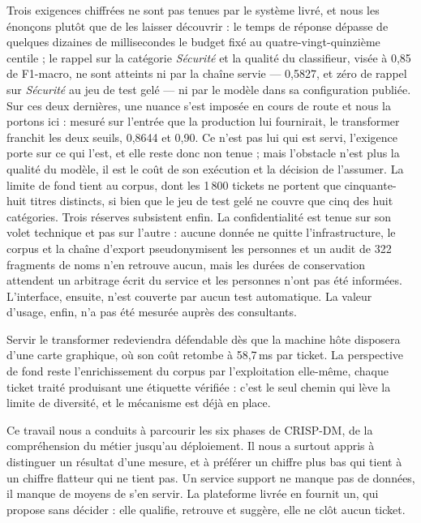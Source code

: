 Trois exigences chiffrées ne sont pas tenues par le système livré, et nous les énonçons plutôt que
de les laisser découvrir : le temps de réponse dépasse de quelques dizaines de millisecondes le
budget fixé au quatre-vingt-quinzième centile ; le rappel sur la catégorie \emph{Sécurité} et la qualité du classifieur,
visée à 0,85 de F1-macro, ne sont atteints ni par la chaîne servie — 0,5827, et zéro de rappel sur
\emph{Sécurité} au jeu de test gelé — ni par le modèle dans sa configuration publiée. Sur ces deux
dernières, une nuance s'est imposée en cours de route et nous la portons ici : mesuré sur l'entrée
que la production lui fournirait, le transformer franchit les deux seuils, 0,8644 et 0,90. Ce
n'est pas lui qui est servi, l'exigence porte sur ce qui l'est, et elle reste donc non tenue ; mais
l'obstacle n'est plus la qualité du modèle, il est le coût de son exécution et la décision de
l'assumer. La
limite de fond tient au corpus, dont les 1\,800 tickets ne portent que cinquante-huit titres
distincts, si bien que le jeu de test gelé ne couvre que cinq des huit catégories. Trois réserves
subsistent enfin. La confidentialité est tenue sur son volet technique et pas sur l'autre : aucune
donnée ne quitte l'infrastructure, le corpus et la chaîne d'export pseudonymisent les personnes et
un audit de 322 fragments de noms n'en retrouve aucun, mais les durées de conservation attendent un
arbitrage écrit du service et les personnes n'ont pas été informées. L'interface, ensuite, n'est
couverte par aucun test automatique. La valeur d'usage, enfin, n'a pas été mesurée auprès des
consultants.

Servir le transformer redeviendra défendable dès que la machine hôte disposera d'une carte
graphique, où son coût retombe à 58,7\,ms par ticket. La perspective de fond reste l'enrichissement
du corpus par l'exploitation elle-même, chaque ticket traité produisant une étiquette vérifiée :
c'est le seul chemin qui lève la limite de diversité, et le mécanisme est déjà en place.

Ce travail nous a conduits à parcourir les six phases de CRISP-DM, de la compréhension du métier
jusqu'au déploiement. Il nous a surtout appris à distinguer un résultat d'une mesure, et à préférer un
chiffre plus bas qui tient à un chiffre flatteur qui ne tient pas. Un service support ne manque pas
de données, il manque de moyens de s'en servir. La plateforme livrée en fournit un, qui propose sans
décider : elle qualifie, retrouve et suggère, elle ne clôt aucun ticket.
